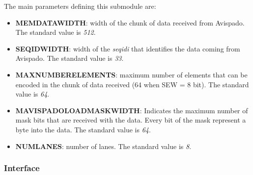 The main parameters defining this submodule are:
\begin{itemize}
    \item \textbf{MEM\+DATA\+WIDTH}: width of the chunk of data received from Avispado. The standard value is \textit{512}.
    
    \item \textbf{SEQ\+ID\+WIDTH}: width of the \textit{seq\+id\+i} that identifies the data coming from Avispado. The standard value is \textit{33}.
    
    \item \textbf{MAX\+NUMBER\+ELEMENTS}: maximum number of elements that can be encoded in the chunk of data received (64 when SEW = 8 bit). The standard value is \textit{64}.
    
    \item \textbf{MAVISPADO\+LOAD\+MASK\+WIDTH}: Indicates the maximum number of mask bits that are received with the data. Every bit of the mask represent a byte into the data. The standard value is \textit{64}.
    
    \item \textbf{NUM\+LANES}: number of lanes. The standard value is \textit{8}.
\end{itemize}

\subsubsection{Interface}

